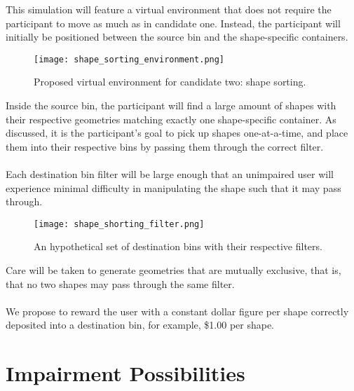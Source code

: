 \documentclass{article}
\begin{document}
This simulation will feature a virtual environment that does not require the participant to move as much as in candidate one. Instead, the participant will initially be positioned between the source bin and the shape-specific containers. 

\begin{figure}[H]
    \texttt{[image: shape\_sorting\_environment.png]}
    \centering
    \caption{Proposed virtual environment for candidate two: shape sorting.}
\end{figure}

Inside the source bin, the participant will find a large amount of shapes with their respective geometries matching exactly one shape-specific container. As discussed, it is the participant's goal to pick up shapes one-at-a-time, and place them into their respective bins by passing them through the correct filter. 
\\
\\
Each destination bin filter will be large enough that an unimpaired user will experience minimal difficulty in manipulating the shape such that it may pass through.

\begin{figure}[H]
    \texttt{[image: shape\_shorting\_filter.png]}
    \centering
    \caption{An hypothetical set of destination bins with their respective filters.}
\end{figure}

Care will be taken to generate geometries that are mutually exclusive, that is, that no two shapes may pass through the same filter.
\\
\\
We propose to reward the user with a constant dollar figure per shape correctly deposited into a destination bin, for example, \$1.00 per shape.

\section*{Impairment Possibilities}
\end{document}

